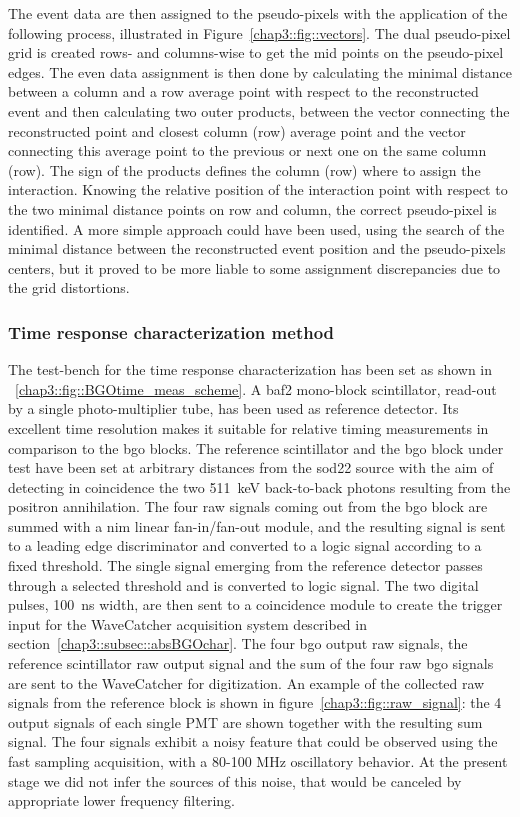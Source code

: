 The event data are then assigned to the pseudo-pixels with the application of the following process, illustrated in Figure~\ref{chap3::fig::vectors}. The dual pseudo-pixel grid is created rows- and columns-wise to get the mid points on the pseudo-pixel edges.  The even data assignment is then done by calculating the minimal distance between a column and a row average point with respect to the reconstructed event and then calculating two outer products, between the vector connecting the reconstructed point and closest column (row) average point and the vector connecting this average point to the previous or next one on the same column (row). The sign of the products defines the column (row) where to assign the interaction.  Knowing the relative position of the interaction point with respect to the two minimal distance points on row and column, the correct pseudo-pixel is identified.  A more simple approach could have been used, using the search of the minimal distance between the reconstructed event position and the pseudo-pixels centers, but it proved to be more liable to some assignment discrepancies due to the grid distortions.


\subsubsection{Time response characterization method}\label{chap3::subsubsec::absTimeMethod}

The test-bench for the time response characterization has been set as shown in \figurename~\ref{chap3::fig::BGOtime_meas_scheme}. A \gls{baf2} mono-block scintillator, read-out by a single photo-multiplier tube, has been used as reference detector. Its excellent time resolution makes it suitable for relative timing measurements in comparison to the \gls{bgo} blocks. The reference scintillator and the \gls{bgo} block under test have been set at arbitrary distances from the \gls{sod22} source with the aim of detecting in coincidence the two 511~keV back-to-back photons resulting from the positron annihilation. The four raw signals coming out from the \gls{bgo} block are summed with a \gls{nim} linear fan-in/fan-out module, and the resulting signal is sent to a leading edge discriminator and converted to a logic signal according to a fixed threshold. The single signal emerging from the reference detector passes through a selected threshold and is converted to logic signal. The two digital pulses, 100~ns width, are then sent to a coincidence module to create the trigger input for the WaveCatcher acquisition system described in section~\ref{chap3::subsec::absBGOchar}. The four \gls{bgo} output raw signals, the reference scintillator raw output signal and the sum of the four raw \gls{bgo} signals are sent to the WaveCatcher for digitization. An example of the collected raw signals from the reference block is shown in figure~\ref{chap3::fig::raw_signal}: the 4 output signals of each single PMT are shown together with the resulting sum signal. The four signals exhibit a noisy feature that could be observed using the fast sampling acquisition, with a 80-100 MHz oscillatory behavior. At the present stage we did not infer the
sources of this noise, that would be canceled by appropriate lower frequency filtering.

